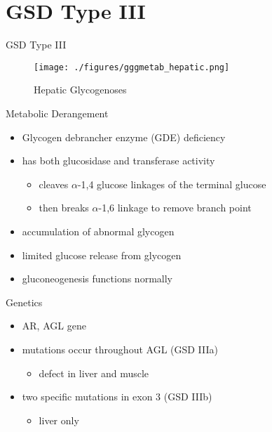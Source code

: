 \documentclass[presentation, smaller]{beamer}
\begin{document}
\section{GSD Type III}
\label{sec:orgd7de33a}
\begin{frame}[label={sec:orga4dbe1e}]{GSD Type III}
\begin{figure}[htbp]
\centering
\texttt{[image: ./figures/gggmetab\_hepatic.png]}
\caption[Hepatic Glycogenoses]{\label{fig:orgbbd3049}
Hepatic Glycogenoses}
\end{figure}
\end{frame}

\begin{frame}[label={sec:org89918a5}]{Metabolic Derangement}
\begin{itemize}
\item Glycogen debrancher enzyme (GDE) deficiency
\item has both glucosidase and transferase activity
\begin{itemize}
\item cleaves \(\alpha\)-1,4 glucose linkages of the terminal glucose
\item then breaks \(\alpha\)-1,6 linkage to remove branch point
\end{itemize}
\item accumulation of abnormal glycogen
\item limited glucose release from glycogen
\item gluconeogenesis functions normally
\end{itemize}
\end{frame}
\begin{frame}[label={sec:orgd15e08f}]{Genetics}
\begin{itemize}
\item AR, AGL gene
\item mutations occur throughout AGL (GSD IIIa)
\begin{itemize}
\item defect in liver and muscle
\end{itemize}
\item two specific mutations in exon 3 (GSD IIIb)
\begin{itemize}
\item liver only
\end{itemize}
\end{itemize}
\end{frame}
\end{document}
